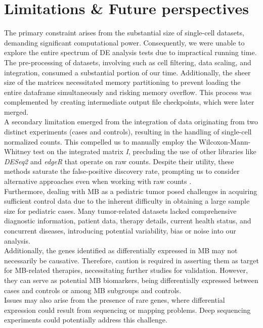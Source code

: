 \documentclass[10pt]{SelfArx} %
\begin{document}
\section{Limitations \& Future perspectives}\label{sec:future_perspectives}
The primary constraint arises from the substantial size of single-cell datasets, demanding significant computational power. Consequently, we were unable to explore the entire spectrum of DE analysis tests due to impractical running time. The pre-processing of datasets, involving such as cell filtering, data scaling, and integration, consumed a substantial portion of our time. Additionally, the sheer size of the matrices necessitated memory partitioning to prevent loading the entire dataframe simultaneously and risking memory overflow. This process was complemented by creating intermediate output file checkpoints, which were later merged. \\
A secondary limitation emerged from the integration of data originating from two distinct experiments (cases and controls), resulting in the handling of single-cell normalized counts. This compelled us to manually employ the Wilcoxon-Mann-Whitney test on the integrated matrix \textit{I}, precluding the use of other libraries like \textit{DESeq2} \cite{love2014moderated} and \textit{edgeR} \cite{robinson2010edger} that operate on raw counts. Despite their utility, these methods saturate the false-positive discovery rate, prompting us to consider alternative approaches even when working with raw counts \cite{li2022exaggerated}. \\
Furthermore, dealing with MB as a pediatric tumor posed challenges in acquiring sufficient control data due to the inherent difficulty in obtaining a large sample size for pediatric cases. Many tumor-related datasets lacked comprehensive diagnostic information, patient data, therapy details, current health status, and concurrent diseases, introducing potential variability, bias or noise into our analysis.\\ 
Additionally, the genes identified as differentially expressed in MB may not necessarily be causative. Therefore, caution is required in asserting them as target for MB-related therapies, necessitating further studies for validation. However, they can serve as potential MB biomarkers, being differentially expressed between cases and controls or among MB subgroups and controls. \\
Issues may also arise from the presence of rare genes, where differential expression could result from sequencing or mapping problems. Deep sequencing experiments could potentially address this challenge.\\
\end{document}
